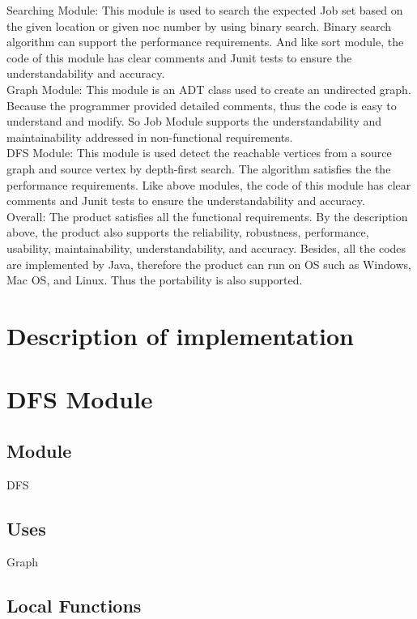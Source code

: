 \documentclass[12pt]{article}
\begin{document}
Searching Module: This module is used to search the expected Job set based on the given location or given noc number by using binary search. Binary search algorithm can support the performance requirements. And like sort module, the code of this module has clear comments and Junit tests to ensure the understandability and accuracy.\\\newline
Graph Module: This module is an ADT class used to create an undirected graph. Because the programmer provided detailed comments, thus the code is easy to understand and modify. So Job Module supports the understandability and maintainability addressed in non-functional requirements.\\\newline
DFS Module: This module is used detect the reachable vertices from a source graph and source vertex by depth-first search. The algorithm satisfies the the performance requirements. Like above modules, the code of this module has clear comments and Junit tests to ensure the understandability and accuracy.\\\newline
Overall: The product satisfies all the functional requirements. By the description above, the product also supports the reliability, robustness, performance, usability, maintainability, understandability, and accuracy. Besides, all the codes are implemented by Java, therefore the product can run on OS such as Windows, Mac OS, and Linux. Thus the portability is also supported.

\section{Description of implementation}
\section* {DFS Module}

\subsection*{Module}

DFS

\subsection* {Uses}

Graph

\subsection*{Local Functions}
\end{document}
